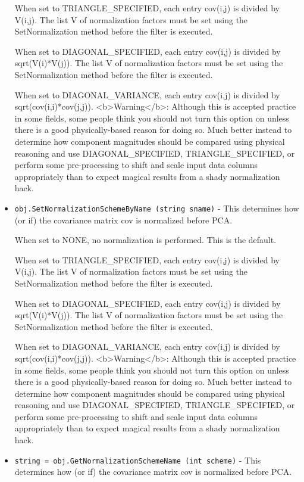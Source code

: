 \begin{itemize}
 When set to TRIANGLE\_SPECIFIED, each entry cov(i,j) is divided by V(i,j).
 The list V of normalization factors must be set using the SetNormalization method
 before the filter is executed.

 When set to DIAGONAL\_SPECIFIED, each entry cov(i,j) is divided by sqrt(V(i)*V(j)).
 The list V of normalization factors must be set using the SetNormalization method
 before the filter is executed.

 When set to DIAGONAL\_VARIANCE, each entry cov(i,j) is divided by sqrt(cov(i,i)*cov(j,j)).
 <b>Warning</b>: Although this is accepted practice in some fields,
 some people think you should not turn this option on unless there
 is a good physically-based reason for doing so. Much better instead
 to determine how component magnitudes should be compared using
 physical reasoning and use DIAGONAL\_SPECIFIED, TRIANGLE\_SPECIFIED, or
 perform some pre-processing to shift and scale input data columns
 appropriately than to expect magical results from a shady normalization hack.

\item  \verb|obj.SetNormalizationSchemeByName (string sname)| -  This determines how (or if) the covariance matrix  cov is normalized before PCA.

 When set to NONE, no normalization is performed. This is the default.

 When set to TRIANGLE\_SPECIFIED, each entry cov(i,j) is divided by V(i,j).
 The list V of normalization factors must be set using the SetNormalization method
 before the filter is executed.

 When set to DIAGONAL\_SPECIFIED, each entry cov(i,j) is divided by sqrt(V(i)*V(j)).
 The list V of normalization factors must be set using the SetNormalization method
 before the filter is executed.

 When set to DIAGONAL\_VARIANCE, each entry cov(i,j) is divided by sqrt(cov(i,i)*cov(j,j)).
 <b>Warning</b>: Although this is accepted practice in some fields,
 some people think you should not turn this option on unless there
 is a good physically-based reason for doing so. Much better instead
 to determine how component magnitudes should be compared using
 physical reasoning and use DIAGONAL\_SPECIFIED, TRIANGLE\_SPECIFIED, or
 perform some pre-processing to shift and scale input data columns
 appropriately than to expect magical results from a shady normalization hack.

\item  \verb|string = obj.GetNormalizationSchemeName (int scheme)| -  This determines how (or if) the covariance matrix  cov is normalized before PCA.


\end{itemize}
